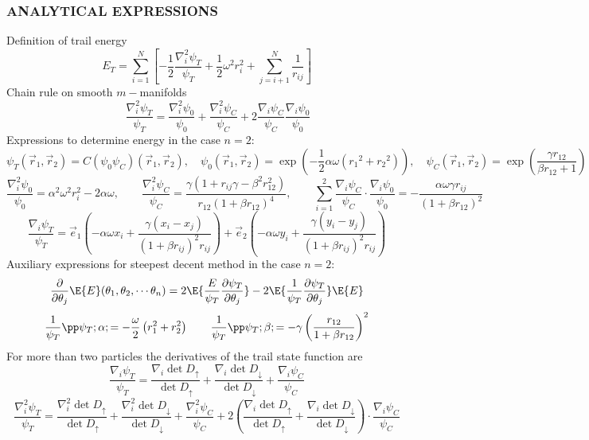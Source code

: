 \documentclass[11pt,english,a4paper]{article}
\begin{document}
\subsubsection*{\uppercase{analytical expressions}}
Definition of trail energy
\begin{equation}
E_T = \sum_{i=1}^N \left[ -\frac{1}{2} \frac{\nabla^2_i \psi_T}{\psi_T} + \frac{1}{2} \omega^2 r_i^2 + \sum_{j=i+1}^N \frac{1}{r_{ij}} \right]
\end{equation}
Chain rule on smooth $m-$manifolds
\[
 \qquad \frac{\nabla_i^2 \psi_T}{\psi_T} = \frac{\nabla_i^2 \psi_0}{\psi_0} + \frac{\nabla_i^2 \psi_C}{\psi_C} + 2\frac{\nabla_i \psi_C}{\psi_C}\frac{\nabla_i \psi_0}{\psi_0}
\]
Expressions to determine energy in the case $n=2$:
\[
\psi_T(\vec{r}_1, \vec{r}_2) = C(\psi_0 \psi_C)(\vec{r}_1, \vec{r}_2), \quad  \psi_0(\vec{r}_1, \vec{r}_2) = \exp \left(-\frac{1}{2} \alpha  \omega  \left( {{r}_1}^2+  {{r}_2}^2\right)\right),  \quad  \psi_C(\vec{r}_1, \vec{r}_2) =  \exp \left( \frac{\gamma r_{  12}}{\beta  r_{  12}+1} \right)
\]
\[
\frac{\nabla_i^2 \psi_0}{\psi_0} = \alpha^2 \omega^2 r_i^2 - 2 \alpha \omega, \qquad
\frac{\nabla_i^2 \psi_C}{\psi_C} = \frac{\gamma (1 + r_{ij} \gamma - \beta^2 r_{  12}^2)}{r_{  12}(1 + \beta r_{  12})^4}, \qquad \sum_{i=1}^2 \frac{\nabla_i \psi_C}{\psi_C}\cdot \frac{\nabla_i \psi_0}{\psi_0} = - \frac{\alpha \omega \gamma r_{ij}}{(1 + \beta r_{12})^2}
\]
\[
\frac{\nabla_i \psi_T}{\psi_T} = \vec{e}_1 \left( -\alpha \omega x_i + \frac{\gamma(x_i - x_j)}{(1 + \beta r_{ij})^2r_{ij}} \right) + \vec{e}_2 \left( - \alpha \omega y_i + \frac{\gamma(y_i-y_j)}{(1 + \beta r_{ij})^2r_{ij}} \right)
\]
Auxiliary expressions for steepest decent method in the case $n=2$:
\[
\frac{\partial}{\partial \theta_j} \E{E}(\theta_1,\theta_2,\cdots \theta_n) = 2 \E{\frac{E}{\psi_T} \frac{\partial \psi_T}{\partial \theta_j} } - 2\E{\frac{1}{\psi_T} \frac{\partial \psi_T}{\partial \theta_j} }\E{E}
\]
\[
\frac{1}{\psi_T}\pp \psi_T; \alpha; = - \frac{\omega}{2} \left( r_1^2 + r_2^2 \right) \qquad 
\frac{1}{\psi_T}\pp \psi_T; \beta; = - \gamma \left( \frac{r_{12}}{1 + \beta r_{12}} \right)^2
\]
For more than two particles the derivatives of the trail state function are
\[
\frac{\nabla_i \psi_T}{\psi_T} = \frac{\nabla_i \det D_\uparrow}{\det D_\uparrow} + \frac{\nabla_i \det D_\downarrow}{\det D_\downarrow} + \frac{\nabla_i \psi_C}{\psi_C}
\]
\[
\frac{\nabla_i^2 \psi_T}{\psi_T} = \frac{\nabla_i^2 \det D_\uparrow}{\det D_\uparrow} + \frac{\nabla_i^2 \det D_\downarrow}{\det D_\downarrow} + \frac{\nabla_i^2 \psi_C}{\psi_C} + 2\left( \frac{\nabla_i \det D_\uparrow}{\det D_\uparrow} + \frac{\nabla_i \det D_\downarrow}{\det D_\downarrow} \right) \cdot \frac{\nabla_i \psi_C}{\psi_C}
\]
\end{document}
